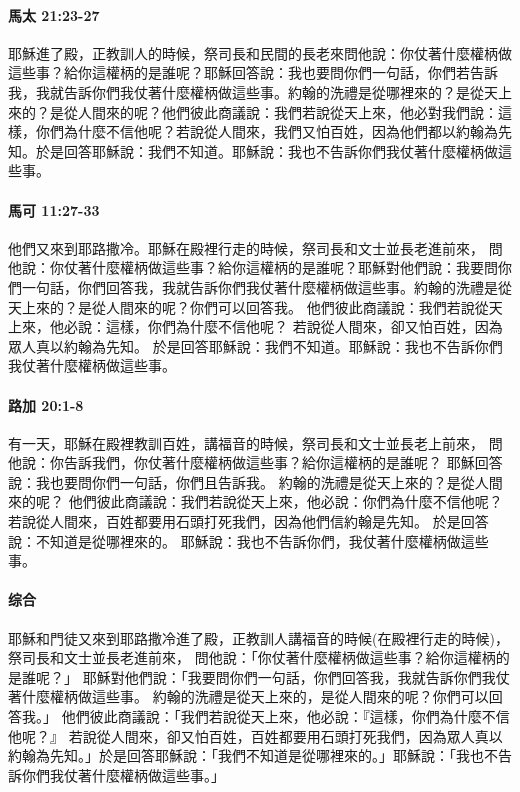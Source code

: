 \paragraph{馬太 21:23-27}
耶穌進了殿，正教訓人的時候，祭司長和民間的長老來問他說：你仗著什麼權柄做這些事？給你這權柄的是誰呢？耶穌回答說：我也要問你們一句話，你們若告訴我，我就告訴你們我仗著什麼權柄做這些事。約翰的洗禮是從哪裡來的？是從天上來的？是從人間來的呢？他們彼此商議說：我們若說從天上來，他必對我們說：這樣，你們為什麼不信他呢？若說從人間來，我們又怕百姓，因為他們都以約翰為先知。於是回答耶穌說：我們不知道。耶穌說：我也不告訴你們我仗著什麼權柄做這些事。
\paragraph{馬可 11:27-33 }
他們又來到耶路撒冷。耶穌在殿裡行走的時候，祭司長和文士並長老進前來，
問他說：你仗著什麼權柄做這些事？給你這權柄的是誰呢？耶穌對他們說：我要問你們一句話，你們回答我，我就告訴你們我仗著什麼權柄做這些事。約翰的洗禮是從天上來的？是從人間來的呢？你們可以回答我。
他們彼此商議說：我們若說從天上來，他必說：這樣，你們為什麼不信他呢？
若說從人間來，卻又怕百姓，因為眾人真以約翰為先知。
於是回答耶穌說：我們不知道。耶穌說：我也不告訴你們我仗著什麼權柄做這些事。
\paragraph{路加 20:1-8}
有一天，耶穌在殿裡教訓百姓，講福音的時候，祭司長和文士並長老上前來，
問他說：你告訴我們，你仗著什麼權柄做這些事？給你這權柄的是誰呢？
耶穌回答說：我也要問你們一句話，你們且告訴我。
約翰的洗禮是從天上來的？是從人間來的呢？
他們彼此商議說：我們若說從天上來，他必說：你們為什麼不信他呢？
若說從人間來，百姓都要用石頭打死我們，因為他們信約翰是先知。
於是回答說：不知道是從哪裡來的。
耶穌說：我也不告訴你們，我仗著什麼權柄做這些事。
\paragraph{综合}
耶穌和門徒又來到耶路撒冷進了殿，正教訓人講福音的時候(在殿裡行走的時候)，祭司長和文士並長老進前來， 問他說：「你仗著什麼權柄做這些事？給你這權柄的是誰呢？」 耶穌對他們說：「我要問你們一句話，你們回答我，我就告訴你們我仗著什麼權柄做這些事。 約翰的洗禮是從天上來的，是從人間來的呢？你們可以回答我。」 他們彼此商議說：「我們若說從天上來，他必說：『這樣，你們為什麼不信他呢？』 若說從人間來，卻又怕百姓，百姓都要用石頭打死我們，因為眾人真以約翰為先知。」於是回答耶穌說：「我們不知道是從哪裡來的。」耶穌說：「我也不告訴你們我仗著什麼權柄做這些事。」

